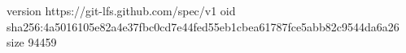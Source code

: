 version https://git-lfs.github.com/spec/v1
oid sha256:4a5016105e82a4e37fbc0cd7e44fed55eb1cbea61787fce5abb82c9544da6a26
size 94459
